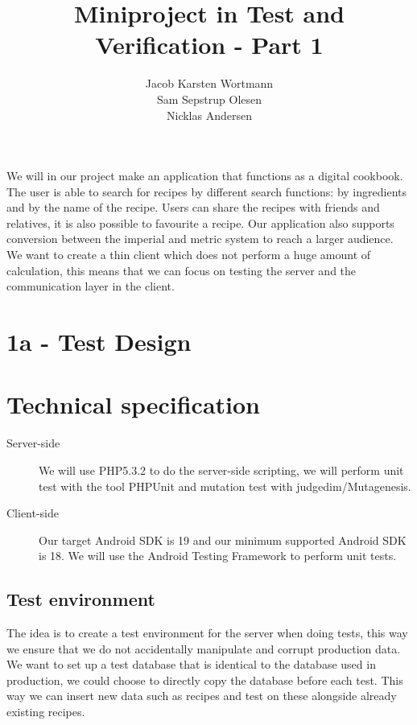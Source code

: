 \documentclass[a4paper,12pt]{memoir}
\title{Miniproject in Test and Verification - Part 1}
\author{Jacob Karsten Wortmann\\Sam Sepstrup Olesen\\Nicklas Andersen}
\begin{document}
\maketitle
We will in our project make an application that functions as a digital cookbook. The user is able to search for recipes by different search functions: by ingredients and by the name of the recipe. Users can share the recipes with friends and relatives, it is also possible to favourite a recipe. Our  application also supports conversion between the imperial and metric system to reach a larger audience. 
We want to create a thin client which does not perform a huge amount of calculation, this means that we can focus on testing the server and the communication layer in the client.

\section*{1a - Test Design}
\section*{Technical specification}
\begin{description}
    \item[Server-side]
        We will use PHP5.3.2 to do the server-side scripting,
        we will perform unit test with the tool PHPUnit and mutation test with judgedim/Mutagenesis.
    \item[Client-side]
        Our target Android SDK is 19 and our minimum supported Android SDK is 18. We will use the Android Testing Framework to perform unit tests.
\end{description}

\subsection{Test environment}
The idea is to create a test environment for the server when doing tests, this way we ensure that we do not accidentally manipulate and corrupt production data. We want to set up a test database that is identical to the database used in production, we could choose to directly copy the database before each test. This way we can insert new data such as recipes and test on these alongside already existing recipes.
\end{document}
